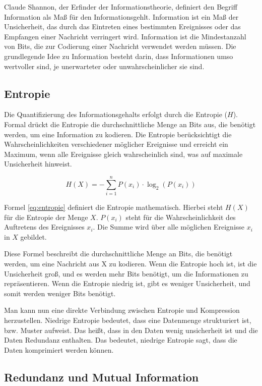 \documentclass[conference]{IEEEtran}
\begin{document}
Claude Shannon, der Erfinder der Informationstheorie, definiert den Begriff Information
als Maß für den Informationsgehlt.
Information ist ein Maß der Unsicherheit, das durch das Eintreten eines bestimmten
Ereignisses oder das Empfangen einer Nachricht verringert wird. \cite{shannon}
Information ist die Mindestanzahl von Bits, die zur Codierung einer Nachricht verwendet
werden müssen. \cite{shannon2}
Die grundlegende Idee zu Information besteht darin, dass Informationen umso wertvoller sind,
je unerwarteter oder unwahrscheinlicher sie sind.

\subsection{Entropie}

Die Quantifizierung des Informationsgehalts erfolgt durch die Entropie ($H$).
Formal drückt die Entropie die durchschnittliche Menge an Bits aus,
die benötigt werden, um eine Information zu kodieren. \cite{shannon}
Die Entropie berücksichtigt die Wahrscheinlichkeiten verschiedener möglicher
Ereignisse und erreicht ein Maximum, wenn alle Ereignisse gleich wahrscheinlich sind,
was auf maximale Unsicherheit hinweist.

\begin{equation}
    \label{eq:entropie}
    H(X) = -\sum_{i=1}^{n} P(x_i) \cdot \log_{2}(P(x_i))
\end{equation}

Formel \ref{eq:entropie} definiert die Entropie mathematisch.
Hierbei steht $H(X)$ für die Entropie der Menge $X$.
$P(x_i)$ steht für die Wahrscheinlichkeit des
Auftretens des Ereignisses $x_i$.
Die Summe wird über alle möglichen Ereignisse
$x_i$ in $X$ gebildet.

Diese Formel beschreibt die durchschnittliche Menge an Bits, die benötigt werden,
um eine Nachricht aus X zu kodieren.
Wenn die Entropie hoch ist, ist die Unsicherheit groß, und es werden mehr Bits
benötigt, um die Informationen zu repräsentieren.
Wenn die Entropie niedrig ist, gibt es weniger Unsicherheit, und somit werden
weniger Bits benötigt.

Man kann nun eine direkte Verbindung zwischen Entropie und Kompression herzustellen.
Niedrige Entropie bedeutet, dass eine Datenmenge strukturiert ist, bzw. Muster aufweist.
Das heißt, dass in den Daten wenig unsicherheit ist und die Daten Redundanz enthalten.
Das bedeutet, niedrige Entropie sagt, dass die Daten komprimiert werden können.


\subsection{Redundanz und Mutual Information}
\end{document}
